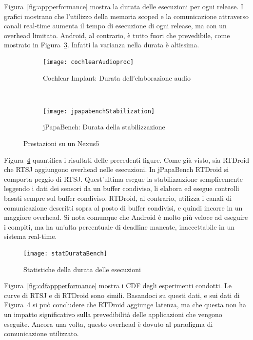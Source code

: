 Figura~\ref{fig:appperformance} mostra la durata delle esecuzioni per ogni release. I grafici mostrano che l'utilizzo della memoria scoped e la comunicazione attraverso canali real-time aumenta il tempo di esecuzione di ogni release, ma con un overhead limitato. Android, al contrario, è tutto fuori che prevedibile, come mostrato in Figura~\ref{fig:performancenx5}. Infatti la varianza nella durata è altissima. 

\begin{figure}[h]
	\centering
	\begin{subfigure}[b]{0.45\textwidth}
		\texttt{[image: cochlearAudioproc]}
		\caption{Cochlear Implant: Durata dell'elaborazione audio}
		\label{fig:cochlearAudioproc}
	\end{subfigure}
	~ 
	\begin{subfigure}[b]{0.45\textwidth}
		\texttt{[image: jpapabenchStabilization]}
		\caption{jPapaBench: Durata della stabilizzazione}
		\label{fig:jpapabenchStabilization}
	\end{subfigure}
	\caption{Prestazioni su un Nexus5}\label{fig:performancenx5}
\end{figure}

Figura~\ref{fig:statduratabench} quantifica i risultati delle precedenti figure. Come già visto, sia RTDroid che RTSJ aggiungono overhead nelle esecuzioni. In jPapaBench RTDroid si comporta peggio di RTSJ. Quest'ultima esegue la stabilizzazione semplicemente leggendo i dati dei sensori da un buffer condiviso, li elabora ed esegue controlli basati sempre sul buffer condiviso. RTDroid, al contrario, utilizza i canali di comunicazione descritti sopra al posto di buffer condivisi, e quindi incorre in un maggiore overhead. Si nota comunque che Android è molto più veloce ad eseguire i compiti, ma ha un'alta percentuale di deadline mancate, inaccettabile in un sistema real-time.
\begin{figure}[h]
	\centering
	\texttt{[image: statDurataBench]}
	\caption{Statistiche della durata delle esecuzioni}
	\label{fig:statduratabench}
\end{figure}

Figura~\ref{fig:cdfappperformance} mostra i CDF degli esperimenti condotti. Le curve di RTSJ e di RTDroid sono simili. Basandoci su questi dati, e sui dati di Figura~\ref{fig:statduratabench} si può concludere che RTDroid aggiunge latenza, ma che questa non ha un impatto significativo sulla prevedibilità delle applicazioni che vengono eseguite. Ancora una volta, questo overhead è dovuto al paradigma di comunicazione utilizzato. 

